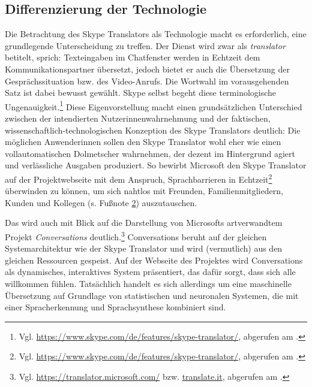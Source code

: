 %

\subsection{Differenzierung der Technologie}
\label{K3:subsec:DiffTech}


Die Betrachtung des Skype Translators als Technologie macht es erforderlich, eine grundlegende Unterscheidung zu treffen. Der Dienst wird zwar als \emph{translator} betitelt, sprich: Texteingaben im Chatfenster werden in Echtzeit dem Kommunikationspartner übersetzt, jedoch bietet er auch die Übersetzung der Gesprächssituation bzw. des Video-Anrufs. Die Wortwahl im vorausgehenden Satz ist dabei bewusst gewählt. Skype selbst begeht diese terminologische Ungenauigkeit.\footnote{Vgl. \url{https://www.skype.com/de/features/skype-translator/}, abgerufen am \datum{}.} Diese Eigenvorstellung macht einen grundsätzlichen Unterschied zwischen der intendierten Nutzer{\textperiodcentered}innenwahrnehmung und der faktischen, wissenschaftlich-technologischen Konzeption des Skype Translators deutlich: Die möglichen Anwender{\textperiodcentered}innen sollen den Skype Translator wohl eher wie einen vollautomatischen Dolmetscher wahrnehmen, der dezent im Hintergrund agiert und verlässliche Ausgaben produziert. So bewirbt Microsoft den Skype Translator auf der Projektwebseite mit dem Anspruch, \glqq Sprachbarrieren in Echtzeit\grqq\footnote{Vgl. \url{https://www.skype.com/de/features/skype-translator/}, abgerufen am \datum{}.\label{K3:footnote:ST-Ad}} überwinden zu können, um sich \glqq nahtlos mit Freunden, Familienmitgliedern, Kunden und Kollegen\grqq{} (s. Fußnote \ref{K3:footnote:ST-Ad}) auszutauschen.

Das wird auch mit Blick auf die Darstellung von Microsofts artverwandtem Projekt \emph{Conversations} deutlich.\footnote{Vgl. \url{https://translator.microsoft.com/} bzw. \url{translate.it}, abgerufen am \datum{}.} Conversations beruht auf der gleichen Systemarchitektur wie der Skype Translator und wird (vermutlich) aus den gleichen Ressourcen gespeist. Auf der Webseite des Projektes wird Conversations als dynamisches, interaktives System präsentiert, das dafür sorgt, \glqq dass sich alle willkommen fühlen\grqq{}. Tatsächlich handelt es sich allerdings um eine maschinelle Übersetzung auf Grundlage von statistischen und neuronalen Systemen, die mit einer Spracherkennung und Sprachsynthese kombiniert sind.

